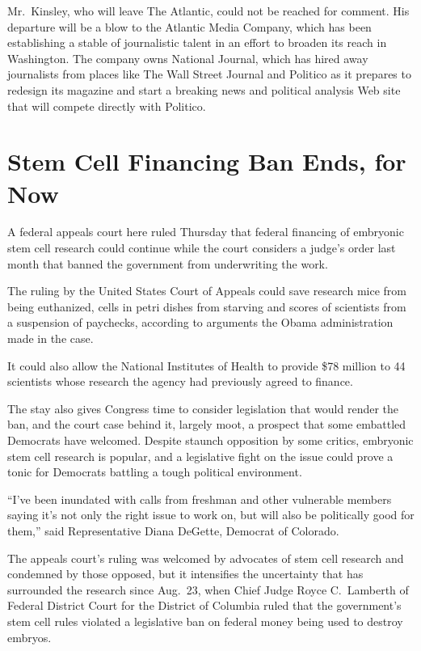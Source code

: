 ﻿\documentclass[12pt]{article}
\begin{document}
Mr.~Kinsley, who will leave The Atlantic, could not be reached for comment. His departure will be a
blow to the Atlantic Media Company, which has been establishing a stable of journalistic talent in
an effort to broaden its reach in Washington. The company owns National Journal, which has hired
away journalists from places like The Wall Street Journal and Politico as it prepares to redesign
its magazine and start a breaking news and political analysis Web site that will compete directly
with Politico.

\pagebreak
\section{Stem Cell Financing Ban Ends, for Now}

\lettrine{A}{} federal appeals court here ruled Thursday that federal
financing of embryonic stem cell research could continue while the court considers a judge's order
last month that banned the government from underwriting the work.

The ruling by the United States Court of Appeals could save research mice from being euthanized,
cells in petri dishes from starving and scores of scientists from a suspension of paychecks,
according to arguments the Obama administration made in the case.

It could also allow the National Institutes of Health to provide \$78 million to 44 scientists whose
research the agency had previously agreed to finance.

The stay also gives Congress time to consider legislation that would render the ban, and the court
case behind it, largely moot, a prospect that some embattled Democrats have welcomed. Despite
staunch opposition by some critics, embryonic stem cell research is popular, and a legislative fight
on the issue could prove a tonic for Democrats battling a tough political environment.

``I've been inundated with calls from freshman and other vulnerable members saying it's not only the
right issue to work on, but will also be politically good for them,'' said Representative Diana
DeGette, Democrat of Colorado.

The appeals court's ruling was welcomed by advocates of stem cell research and condemned by those
opposed, but it intensifies the uncertainty that has surrounded the research since Aug.~23, when
Chief Judge Royce C.~Lamberth of Federal District Court for the District of Columbia ruled that the
government's stem cell rules violated a legislative ban on federal money being used to destroy
embryos.
\end{document}
